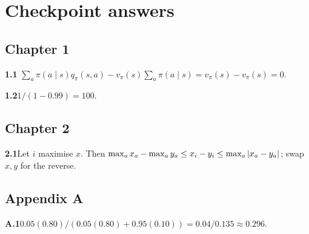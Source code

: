 \chapter*{Checkpoint answers}

\section*{Chapter 1}

\textbf{1.1}\quad
$\sum_a\pi(a\mid s)q_\pi(s,a)-v_\pi(s)\sum_a\pi(a\mid s)=v_\pi(s)-v_\pi(s)=0$.

\textbf{1.2}\quad $1/(1-0.99)=100$.

\section*{Chapter 2}

\textbf{2.1}\quad Let $i$ maximise $x$. Then
$\max_a x_a-\max_a y_a\leq x_i-y_i\leq\max_a\left\lvert x_a-y_a\right\rvert$; swap $x,y$ for the reverse.

\section*{Appendix A}

\textbf{A.1}\quad $0.05(0.80)/(0.05(0.80)+0.95(0.10))=0.04/0.135\approx0.296$.
